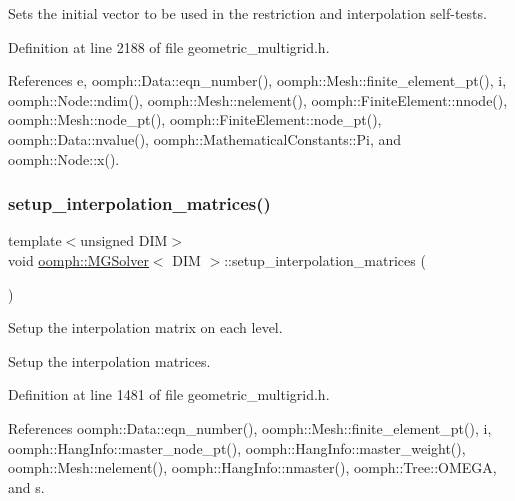 Sets the initial vector to be used in the restriction and interpolation self-\/tests. 

Definition at line 2188 of file geometric\+\_\+multigrid.\+h.



References e, oomph\+::\+Data\+::eqn\+\_\+number(), oomph\+::\+Mesh\+::finite\+\_\+element\+\_\+pt(), i, oomph\+::\+Node\+::ndim(), oomph\+::\+Mesh\+::nelement(), oomph\+::\+Finite\+Element\+::nnode(), oomph\+::\+Mesh\+::node\+\_\+pt(), oomph\+::\+Finite\+Element\+::node\+\_\+pt(), oomph\+::\+Data\+::nvalue(), oomph\+::\+Mathematical\+Constants\+::\+Pi, and oomph\+::\+Node\+::x().

\mbox{\label{classoomph_1_1MGSolver_a368106b0ca8332ab5a6571b9421822e2}} 
\subsubsection{\texorpdfstring{setup\+\_\+interpolation\+\_\+matrices()}{setup\_interpolation\_matrices()}}
{\footnotesize\ttfamily template$<$unsigned D\+IM$>$ \\
void \hyperlink{classoomph_1_1MGSolver}{oomph\+::\+M\+G\+Solver}$<$ D\+IM $>$\+::setup\+\_\+interpolation\+\_\+matrices (\begin{DoxyParamCaption}{ }\end{DoxyParamCaption})}



Setup the interpolation matrix on each level. 

Setup the interpolation matrices. 

Definition at line 1481 of file geometric\+\_\+multigrid.\+h.



References oomph\+::\+Data\+::eqn\+\_\+number(), oomph\+::\+Mesh\+::finite\+\_\+element\+\_\+pt(), i, oomph\+::\+Hang\+Info\+::master\+\_\+node\+\_\+pt(), oomph\+::\+Hang\+Info\+::master\+\_\+weight(), oomph\+::\+Mesh\+::nelement(), oomph\+::\+Hang\+Info\+::nmaster(), oomph\+::\+Tree\+::\+O\+M\+E\+GA, and s.

\mbox{\label{classoomph_1_1MGSolver_a923c121b000fc5372664045c764b163f}} 
